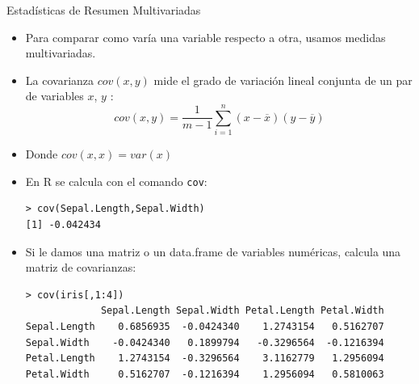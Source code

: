 \documentclass[handout]{beamer}
\begin{document}
\begin{frame}[fragile]{Estadísticas de Resumen Multivariadas}
\scriptsize{
\begin{itemize}
 \item Para comparar como varía una variable  respecto a otra, usamos medidas multivariadas.
 \item La covarianza $cov(x,y)$  mide el grado de variación lineal conjunta de un par de variables $x$, $y$ :
 \begin{displaymath}
  cov(x,y)=\frac{1}{m-1}\sum_{i=1}^{n}(x-\overline{x})(y-\overline{y})
 \end{displaymath}
 \item Donde $cov(x,x)=var(x)$
\item En R se calcula con el comando \verb+cov+:
\begin{verbatim}
> cov(Sepal.Length,Sepal.Width)
[1] -0.042434 
\end{verbatim}
\item Si le damos una matriz o un data.frame de variables numéricas, calcula una matriz de covarianzas:
\begin{verbatim}
> cov(iris[,1:4])
             Sepal.Length Sepal.Width Petal.Length Petal.Width
Sepal.Length    0.6856935  -0.0424340    1.2743154   0.5162707
Sepal.Width    -0.0424340   0.1899794   -0.3296564  -0.1216394
Petal.Length    1.2743154  -0.3296564    3.1162779   1.2956094
Petal.Width     0.5162707  -0.1216394    1.2956094   0.5810063 
\end{verbatim}

 
 
\end{itemize}



}
\end{frame}
\end{document}
